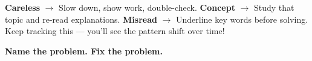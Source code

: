 {\begin{tcolorbox}[
    enhanced,
    colback=funYellowLight,
    colframe=funYellow!60,
    arc=10pt,
    boxrule=1pt,
    left=6mm, right=6mm, top=4mm, bottom=4mm,
]
\vspace{2mm}

\textbf{Careless} $\rightarrow$ Slow down, show work, double-check. \textbf{Concept} $\rightarrow$ Study that topic and re-read explanations. \textbf{Misread} $\rightarrow$ Underline key words before solving. Keep tracking this — you'll see the pattern shift over time!
\end{tcolorbox}

\vspace{4mm}

\begin{center}
{\large\bfseries\color{funOrangeDark} \faBrain\hspace{2mm}Name the problem. Fix the problem.\hspace{2mm}\faBrain}
\end{center}

}
\newpage
